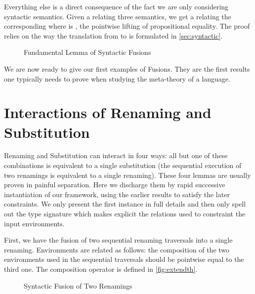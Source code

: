 
Everything else is a direct consequence of the fact we are only considering
syntactic semantics. Given a  relating three 
semantics, we get a  relating the corresponding  where
 is , the pointwise lifting of propositional equality. The proof
relies on the way the translation from  to  is formulated
in \cref{sec:syntactic}.

\begin{figure}
\caption{Fundamental Lemma of Syntactic Fusions\label{fig:fundamentalsynfus}}
\end{figure}

We are now ready to give our first examples of Fusions. They are the first results one
typically needs to prove when studying the meta-theory of a language.

\section{Interactions of Renaming and Substitution}

Renaming and Substitution can interact in four ways: all but one of these
combinations is equivalent to a single substitution (the sequential execution
of two renamings is equivalent to a single renaming). These four lemmas are
usually proven in painful separation. Here we discharge them by rapid successive
instantiation of our framework, using the earlier results to satisfy the later
constraints. We only present the first instance in full details and then only
spell out the  type signature which makes explicit the relations
used to constraint the input environments.

First, we have the fusion of two sequential renaming traversals into a single
renaming. Environments are related as follows: the composition of the two
environments used in the sequential traversals should be pointwise equal to
the third one. The composition operator  is defined in \cref{fig:extendth}.

\begin{figure}[h]
\caption{Syntactic Fusion of Two Renamings\label{fig:renrenfus}}
\end{figure}

